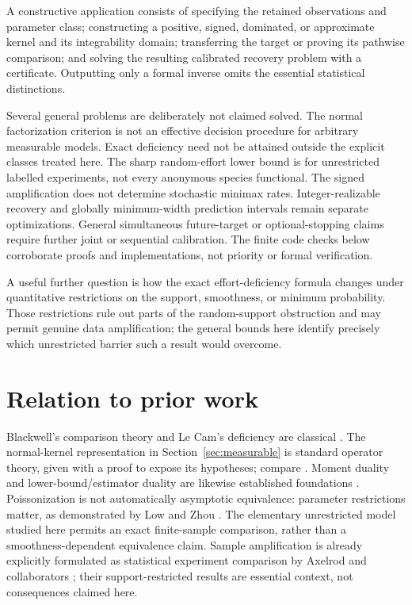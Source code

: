 \documentclass[11pt]{article}
\numberwithin{equation}{section}
\theoremstyle{definition}
\theoremstyle{remark}
\begin{document}
A constructive application consists of specifying the retained observations and parameter class; constructing a positive, signed, dominated, or approximate kernel and its integrability domain; transferring the target or proving its pathwise comparison; and solving the resulting calibrated recovery problem with a certificate. Outputting only a formal inverse omits the essential statistical distinctions.

Several general problems are deliberately not claimed solved. The normal factorization criterion is not an effective decision procedure for arbitrary measurable models. Exact deficiency need not be attained outside the explicit classes treated here. The sharp random-effort lower bound is for unrestricted labelled experiments, not every anonymous species functional. The signed amplification does not determine stochastic minimax rates. Integer-realizable recovery and globally minimum-width prediction intervals remain separate optimizations. General simultaneous future-target or optional-stopping claims require further joint or sequential calibration. The finite code checks below corroborate proofs and implementations, not priority or formal verification.

A useful further question is how the exact effort-deficiency formula changes under quantitative restrictions on the support, smoothness, or minimum probability. Those restrictions rule out parts of the random-support obstruction and may permit genuine data amplification; the general bounds here identify precisely which unrestricted barrier such a result would overcome.

\section{Relation to prior work}\label{sec:prior}
Blackwell's comparison theory and Le Cam's deficiency are classical \cite{Blackwell1953,LeCam1964,Torgersen1991}. The normal-kernel representation in Section~\ref{sec:measurable} is standard operator theory, given with a proof to expose its hypotheses; compare \cite[Section 2]{KuhnKunze2022}. Moment duality and lower-bound/estimator duality are likewise established foundations \cite{LongI,PolyanskiyWu2021}. Poissonization is not automatically asymptotic equivalence: parameter restrictions matter, as demonstrated by Low and Zhou \cite{LowZhou2007}. The elementary unrestricted model studied here permits an exact finite-sample comparison, rather than a smoothness-dependent equivalence claim. Sample amplification is already explicitly formulated as statistical experiment comparison by Axelrod and collaborators \cite{Axelrod2020,Axelrod2024}; their support-restricted results are essential context, not consequences claimed here.
\end{document}
